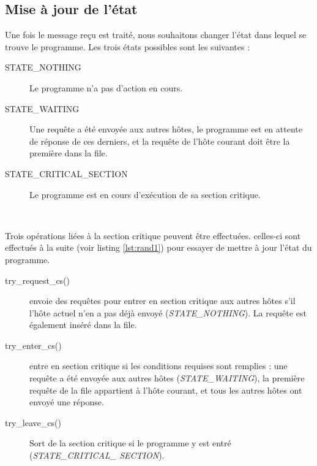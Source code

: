 \subsection{Mise à jour de l'état}
Une fois le message reçu est traité, nous souhaitons changer l'état dans lequel se trouve le programme. Les trois états possibles sont les suivantes :\\

\begin{description}
    \item[STATE\_NOTHING] Le programme n'a pas d'action en cours.
    \item[STATE\_WAITING] Une requête a été envoyée aux autres hôtes, le programme est en attente de réponse de ces derniers, et la requête de l'hôte courant doit être la première dans la file.
    \item[STATE\_CRITICAL\_SECTION] Le programme est en cours d'exécution de sa section critique.
\end{description}
\

Trois opérations liées à la section critique peuvent être effectuées. celles-ci sont effectués à la suite (voir listing \ref{lst:rand1}) pour essayer de mettre à jour l'état du programme.\\

\begin{description}
    \item[try\_request\_cs()] envoie des requêtes pour entrer en section critique aux autres hôtes s'il l'hôte actuel n'en a pas déjà envoyé (\emph{STATE\_NOTHING}). La requête est également inséré dans la file.

    \item[try\_enter\_cs()] entre en section critique si les conditions requises sont remplies : une requête a été envoyée aux autres hôtes (\emph{STATE\_WAITING}), la première requête de la file appartient à l'hôte courant, et tous les autres hôtes ont envoyé une réponse.

    \item[try\_leave\_cs()] Sort de la section critique si le programme y est entré (\emph{STATE\_CRITICAL\_ SECTION}).
\end{description}

